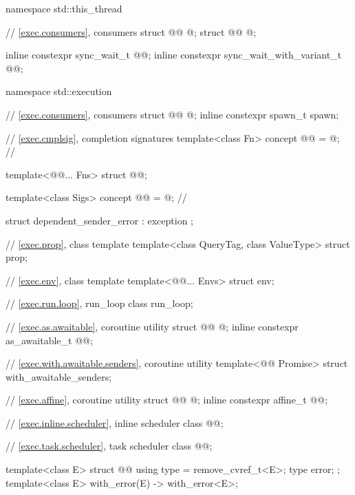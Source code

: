 \begin{codeblock}
namespace std::this_thread {
  // \ref{exec.consumers}, consumers
  struct @@ { @\unspec@ };
  struct @@ { @\unspec@ };

  inline constexpr sync_wait_t @@{};
  inline constexpr sync_wait_with_variant_t @@{};
}

namespace std::execution {
  // \ref{exec.consumers}, consumers
  struct @@ { @\unspec@ };
  inline constexpr spawn_t spawn{};

  // \ref{exec.cmplsig}, completion signatures
  template<class Fn>
    concept @@ = @\seebelownc@;                   // \expos

  template<@@... Fns>
    struct @@;

  template<class Sigs>
    concept @@ = @\seebelownc@;            // \expos

  struct dependent_sender_error : exception {};

  // \ref{exec.prop}, class template 
  template<class QueryTag, class ValueType>
    struct prop;

  // \ref{exec.env}, class template 
  template<@@... Envs>
    struct env;

  // \ref{exec.run.loop}, run_loop
  class run_loop;

  // \ref{exec.as.awaitable}, coroutine utility 
  struct @@ { @\unspec@ };
  inline constexpr as_awaitable_t @@{};

  // \ref{exec.with.awaitable.senders}, coroutine utility 
  template<@@ Promise>
    struct with_awaitable_senders;

  // \ref{exec.affine}, coroutine utility 
  struct @@ { @\unspec@ };
  inline constexpr affine_t @@{};

  // \ref{exec.inline.scheduler}, inline scheduler
  class @@;

  // \ref{exec.task.scheduler}, task scheduler
  class @@;

  template<class E>
  struct @@ {
    using type = remove_cvref_t<E>;
    type error;
  };
  template<class E>
    with_error(E) -> with_error<E>;

}
\end{codeblock}
